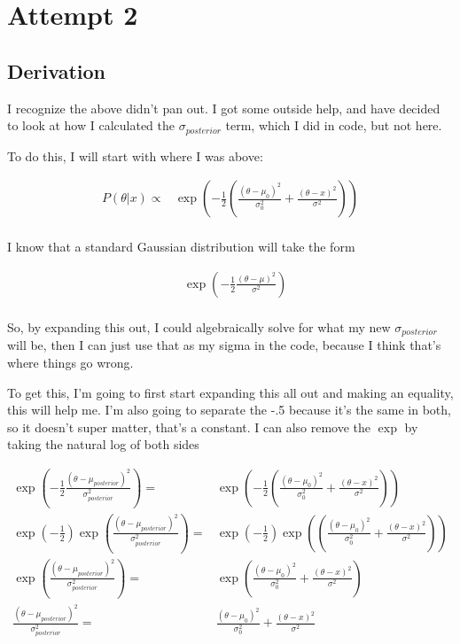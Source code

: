 \documentclass{article}
\begin{document}
\chapter{Attempt 2}

\section{Derivation}

I recognize the above didn't pan out. I got some outside help, and have decided to look at how I calculated the $\sigma_{posterior}$ term, which I did in code, but not here.

To do this, I will start with where I was above:

\begin{align*}
    P(\theta|x) \propto& \exp(-\frac{1}{2}(\frac{(\theta - \mu_0)^2}{\sigma_0^2}+\frac{(\theta - x)^2}{\sigma^2}))\\
\end{align*}

I know that a standard Gaussian distribution will take the form

\begin{align*}
    & \exp(-\frac{1}{2}\frac{(\theta - \mu)^2}{\sigma^2})\\
\end{align*}

So, by expanding this out, I could algebraically solve for what my new $\sigma_{posterior}$ will be, then I can just use that as my sigma in the code, because I think that's where things go wrong.

To get this, I'm going to first start expanding this all out and making an equality, this will help me. I'm also going to separate the -.5 because it's the same in both, so it doesn't super matter, that's a constant. I can also remove the $\exp$ by taking the natural log of both sides

\begin{align*}
    \exp(-\frac{1}{2}\frac{(\theta - \mu_{posterior})^2}{\sigma_{posterior}^2})
    =& 
    \exp(-\frac{1}{2}(\frac{(\theta - \mu_0)^2}{\sigma_0^2}+\frac{(\theta - x)^2}{\sigma^2}))\\
    \exp(-\frac{1}{2})\exp(\frac{(\theta - \mu_{posterior})^2}{\sigma_{posterior}^2})
    =& 
    \exp(-\frac{1}{2})\exp((\frac{(\theta - \mu_0)^2}{\sigma_0^2}+\frac{(\theta - x)^2}{\sigma^2}))\\
    \exp(\frac{(\theta - \mu_{posterior})^2}{\sigma_{posterior}^2})
    =& 
    \exp(\frac{(\theta - \mu_0)^2}{\sigma_0^2}+\frac{(\theta - x)^2}{\sigma^2})\\
    \frac{(\theta - \mu_{posterior})^2}{\sigma_{posterior}^2}
    =& 
    \frac{(\theta - \mu_0)^2}{\sigma_0^2}+\frac{(\theta - x)^2}{\sigma^2}\\
\end{align*}
\end{document}
